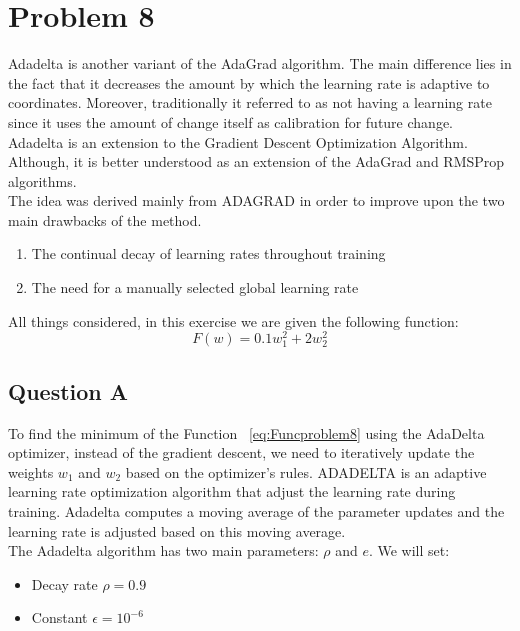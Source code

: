 \section{Problem 8}
Adadelta is another variant of the AdaGrad algorithm. The main difference lies in the fact that it decreases the amount by which the learning rate is adaptive to coordinates. Moreover, traditionally it referred to as not having a learning rate since it uses the amount of change itself as calibration for future change. Adadelta is an extension to the Gradient Descent Optimization Algorithm. Although, it is better understood as an extension of the AdaGrad and RMSProp algorithms. \\

The idea was derived mainly from ADAGRAD in order to improve upon the two main drawbacks of the method.
\begin{enumerate}
	\item The continual decay of learning rates throughout training
	\item The need for a manually selected
	global learning rate
\end{enumerate}

All things considered, in this exercise we are given the following function:
\begin{equation}
	F(w) = 0.1w_1^2 + 2w_2^2
\end{equation}
\label{eq:Funcproblem8}
\vspace{1mm}

\subsection{Question A}
To find the minimum of the Function ~\ref{eq:Funcproblem8} using the AdaDelta optimizer, instead of the gradient descent, we need to iteratively update the weights $w_1$ and $w_2$ based on the optimizer's rules. ADADELTA is an adaptive learning rate optimization algorithm that adjust the learning rate during training. Adadelta computes a moving average of the parameter updates and the learning rate is adjusted based on this moving average.\\

The Adadelta algorithm has two main parameters: $\rho$ and $e$. We will set:
\begin{itemize}
	\item Decay rate $\rho = 0.9$
	\item Constant $\epsilon = 10^{-6}$ 
\end{itemize}

